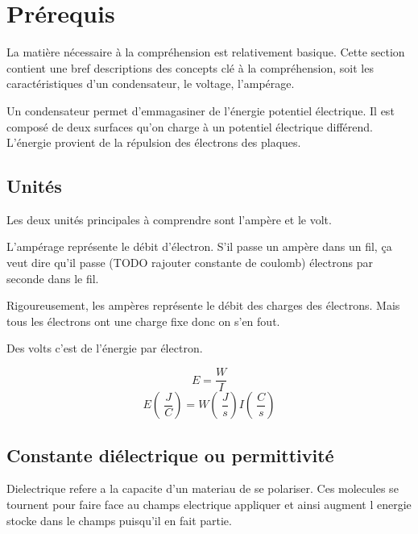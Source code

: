 \documentclass[12 pt, a4paper]{report} %
\begin{document}
\pagebreak

\section{Prérequis}

La matière nécessaire à la compréhension est relativement basique. Cette section contient une bref descriptions des concepts clé à la compréhension, soit les caractéristiques d'un condensateur, le voltage, l'ampérage.

Un condensateur permet d'emmagasiner de l'énergie potentiel électrique. Il est composé de deux surfaces qu'on charge à un potentiel électrique différend. L'énergie provient de la répulsion des électrons des plaques.

\subsection{Unités}

Les deux unités principales à comprendre sont l'ampère et le volt.

L'ampérage représente le débit d'électron. S'il passe un ampère dans un fil, ça veut dire qu'il passe (TODO rajouter constante de coulomb) électrons par seconde dans le fil.

Rigoureusement, les ampères représente le débit des charges des électrons. Mais tous les électrons ont une charge fixe donc on s'en fout.

Des volts c'est de l'énergie par électron.

\begin{equation}
    E = \frac{W}{I}
\end{equation}
\begin{equation}
    E(\SI{}{\frac{J}{C}}) = W(\SI{}{\frac{J}{s}})I(\SI{}{\frac{C}{s}})
\end{equation}


\subsection{Constante diélectrique ou permittivité}

Dielectrique refere a la capacite d'un materiau de se polariser. Ces molecules se tournent pour faire face au champs electrique appliquer et ainsi augment l energie stocke dans le champs puisqu'il en fait partie.
\end{document}
